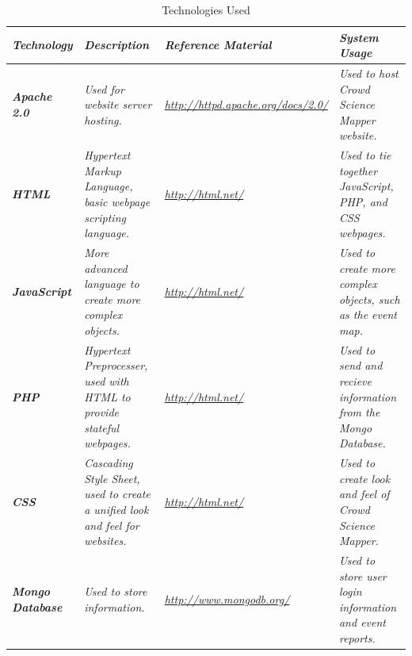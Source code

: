 \begin{table}[tbh]
\caption{Technologies Used \label{technologies}}
\begin{center}
\begin{tabular}{|>{\raggedright}p{2cm}|>{\raggedright}p{4cm}|>{\raggedright}p{4cm}|>{\raggedright}p{4cm}|}

  \hline
\textit{\textbf{Technology}} &  \textit{\textbf{Description}} & \textit{\textbf{Reference Material}} & \textit{\textbf{System Usage}}\tabularnewline
\hline
 \textit{\textbf{Apache 2.0}} & \textit{Used for website server hosting.} & \textit{\url{http://httpd.apache.org/docs/2.0/}} & \textit{Used to host Crowd Science Mapper website.}\tabularnewline
\hline
 \textit{\textbf{HTML}} & \textit{Hypertext Markup Language, basic webpage scripting language.} & \textit{\url{http://html.net/}} & \textit{Used to tie together JavaScript, PHP, and CSS webpages.}\tabularnewline
 \hline
  \textit{\textbf{JavaScript}} & \textit{More advanced language to create more complex objects.} & \textit{\url{http://html.net/}} & \textit{Used to create more complex objects, such as the event map.}\tabularnewline
 \hline
  \textit{\textbf{PHP}} & \textit{Hypertext Preprocesser, used with HTML to provide stateful webpages.} & \textit{\url{http://html.net/}} & \textit{Used to send and recieve information from the Mongo Database.}\tabularnewline
 \hline
  \textit{\textbf{CSS}} & \textit{Cascading Style Sheet, used to create a unified look and feel for websites.} & \textit{\url{http://html.net/}} & \textit{Used to create look and feel of Crowd Science Mapper.}\tabularnewline
 \hline
  \textit{\textbf{Mongo Database}} & \textit{Used to store information.} & \textit{\url{http://www.mongodb.org/}} & \textit{Used to store user login information and event reports.}\tabularnewline
\hline
\end{tabular}
\end{center}
\end{table}

